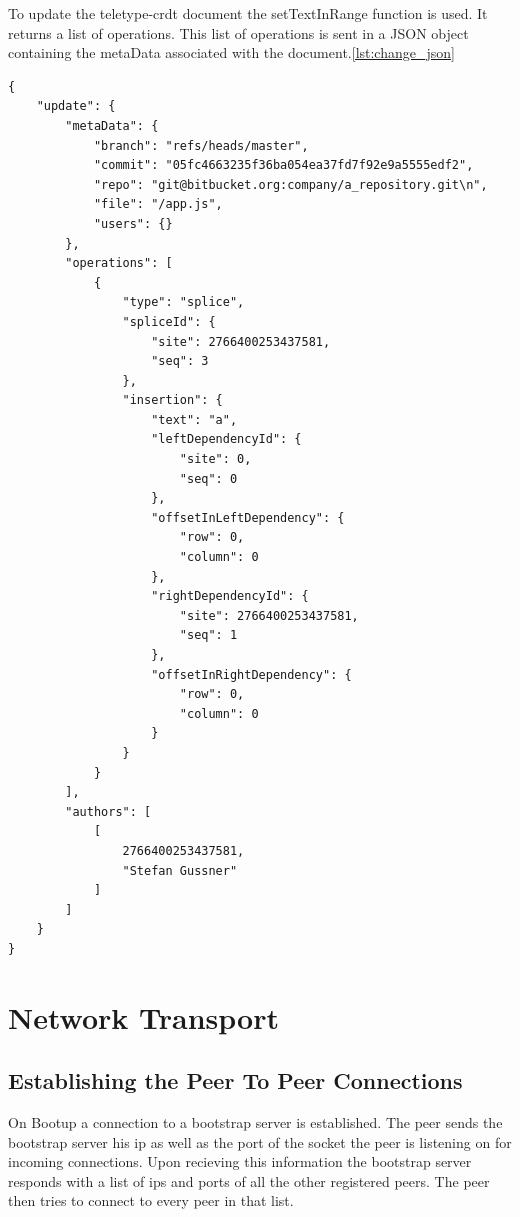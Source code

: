 To update the teletype-crdt document the setTextInRange function is used. It returns a list of operations. This list of operations is sent in a JSON object containing the metaData associated with the document.\ref{lst:change_json}

\begin{lstlisting}[label={lst:change_json}, caption=Network Data Packet]
{
    "update": {
        "metaData": {
            "branch": "refs/heads/master",
            "commit": "05fc4663235f36ba054ea37fd7f92e9a5555edf2",
            "repo": "git@bitbucket.org:company/a_repository.git\n",
            "file": "/app.js",
            "users": {}
        },
        "operations": [
            {
                "type": "splice",
                "spliceId": {
                    "site": 2766400253437581,
                    "seq": 3
                },
                "insertion": {
                    "text": "a",
                    "leftDependencyId": {
                        "site": 0,
                        "seq": 0
                    },
                    "offsetInLeftDependency": {
                        "row": 0,
                        "column": 0
                    },
                    "rightDependencyId": {
                        "site": 2766400253437581,
                        "seq": 1
                    },
                    "offsetInRightDependency": {
                        "row": 0,
                        "column": 0
                    }
                }
            }
        ],
        "authors": [
            [
                2766400253437581,
                "Stefan Gussner"
            ]
        ]
    }
}
\end{lstlisting}

\section{Network Transport}

\subsection{Establishing the Peer To Peer Connections}
On Bootup a connection to a bootstrap server is established. 
The peer sends the bootstrap server his ip as well as the port of the socket the peer is listening on for incoming connections.
Upon recieving this information the bootstrap server responds with a list of ips and ports of all the other registered peers.
The peer then tries to connect to every peer in that list.

